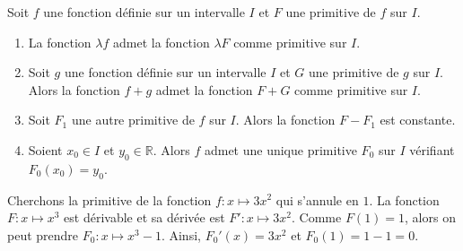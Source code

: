       \begin{thm}
      Soit $f$ une fonction d\'efinie sur un intervalle $I$ et $F$ une primitive de $f$ sur $I$.
      \begin{enumerate}
            \item 
                  La fonction $\lambda f$ admet la fonction $\lambda F$ comme primitive sur $I$.
            \item 
                  Soit $g$ une fonction d\'efinie sur un intervalle $I$ et $G$ une primitive de $g$ sur $I$.
                  Alors la fonction $f+g$ admet la fonction $F+G$ comme primitive sur $I$.      
            \item 
                  Soit $F_1$ une autre primitive de $f$ sur $I$.
                  Alors la fonction $F - F_1$ est constante.
            \item 
                  Soient $x_0\in I$ et $y_0\in \mathbb{R}$.
                  Alors $f$ admet une unique primitive $F_0$ sur $I$ v\'erifiant $F_0 (x_0) = y_0$.
      \end{enumerate}
            \begin{ex}
                  Cherchons la primitive de la fonction $f:x\mapsto 3 x^2$ qui s'annule en $1$.
                  La fonction $F:x\mapsto x^3$ est d\'erivable et sa d\'eriv\'ee est $F':x\mapsto 3x^2$.
                  Comme $F(1)=1$, alors on peut prendre $F_0 : x\mapsto x^3 - 1$.
                  Ainsi, $F_0' (x) = 3x^2$ et $F_0 (1) = 1 - 1 = 0$.
            \end{ex}
      \end{thm}
%
